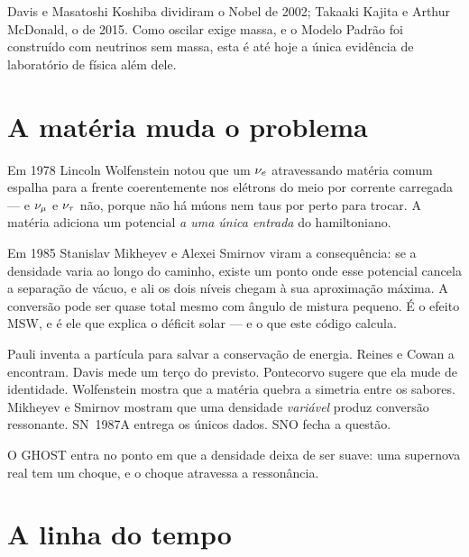 Davis e Masatoshi Koshiba dividiram o Nobel de 2002; Takaaki Kajita e Arthur
McDonald, o de 2015. Como oscilar exige massa, e o Modelo Padrão foi construído
com neutrinos sem massa, esta é até hoje a única evidência de laboratório de
física além dele.

\section{A matéria muda o problema}

Em 1978 Lincoln Wolfenstein notou que um $\nu_e$ atravessando matéria comum
espalha para a frente coerentemente nos elétrons do meio por corrente carregada
--- e $\nu_\mu$ e $\nu_\tau$ não, porque não há múons nem taus por perto para
trocar. A matéria adiciona um potencial \emph{a uma única entrada} do
hamiltoniano.

Em 1985 Stanislav Mikheyev e Alexei Smirnov viram a consequência: se a densidade
varia ao longo do caminho, existe um ponto onde esse potencial cancela a
separação de vácuo, e ali os dois níveis chegam à sua aproximação máxima. A
conversão pode ser quase total mesmo com ângulo de mistura pequeno. É o efeito
MSW, e é ele que explica o déficit solar --- e o que este código calcula.

\begin{conceito}
Pauli inventa a partícula para salvar a conservação de energia. Reines e Cowan a
encontram. Davis mede um terço do previsto. Pontecorvo sugere que ela mude de
identidade. Wolfenstein mostra que a matéria quebra a simetria entre os sabores.
Mikheyev e Smirnov mostram que uma densidade \emph{variável} produz conversão
ressonante. SN~1987A entrega os únicos dados. SNO fecha a questão.

\medskip
O GHOST entra no ponto em que a densidade deixa de ser suave: uma supernova real
tem um choque, e o choque atravessa a ressonância.
\end{conceito}

\section{A linha do tempo}

